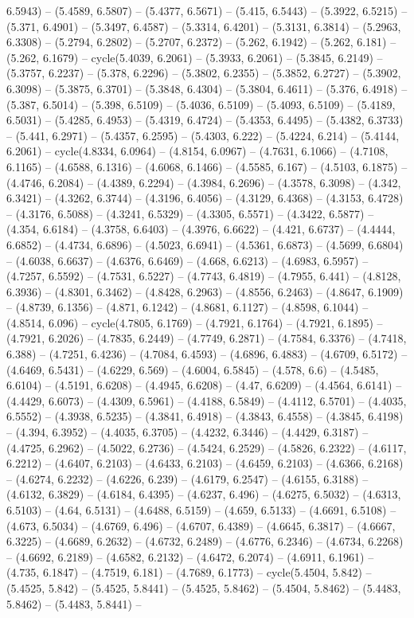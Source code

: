 6.5943) -- (5.4589, 6.5807) -- (5.4377, 6.5671) -- (5.415, 6.5443) -- (5.3922, 6.5215) -- (5.371, 6.4901) -- (5.3497, 6.4587) -- (5.3314, 6.4201) -- (5.3131, 6.3814) -- (5.2963, 6.3308) -- (5.2794, 6.2802) -- (5.2707, 6.2372) -- (5.262, 6.1942) -- (5.262, 6.181) -- (5.262, 6.1679) -- cycle(5.4039, 6.2061) -- (5.3933, 6.2061) -- (5.3845, 6.2149) -- (5.3757, 6.2237) -- (5.378, 6.2296) -- (5.3802, 6.2355) -- (5.3852, 6.2727) -- (5.3902, 6.3098) -- (5.3875, 6.3701) -- (5.3848, 6.4304) -- (5.3804, 6.4611) -- (5.376, 6.4918) -- (5.387, 6.5014) -- (5.398, 6.5109) -- (5.4036, 6.5109) -- (5.4093, 6.5109) -- (5.4189, 6.5031) -- (5.4285, 6.4953) -- (5.4319, 6.4724) -- (5.4353, 6.4495) -- (5.4382, 6.3733) -- (5.441, 6.2971) -- (5.4357, 6.2595) -- (5.4303, 6.222) -- (5.4224, 6.214) -- (5.4144, 6.2061) -- cycle(4.8334, 6.0964) -- (4.8154, 6.0967) -- (4.7631, 6.1066) -- (4.7108, 6.1165) -- (4.6588, 6.1316) -- (4.6068, 6.1466) -- (4.5585, 6.167) -- (4.5103, 6.1875) -- (4.4746, 6.2084) -- (4.4389, 6.2294) -- (4.3984, 6.2696) -- (4.3578, 6.3098) -- (4.342, 6.3421) -- (4.3262, 6.3744) -- (4.3196, 6.4056) -- (4.3129, 6.4368) -- (4.3153, 6.4728) -- (4.3176, 6.5088) -- (4.3241, 6.5329) -- (4.3305, 6.5571) -- (4.3422, 6.5877) -- (4.354, 6.6184) -- (4.3758, 6.6403) -- (4.3976, 6.6622) -- (4.421, 6.6737) -- (4.4444, 6.6852) -- (4.4734, 6.6896) -- (4.5023, 6.6941) -- (4.5361, 6.6873) -- (4.5699, 6.6804) -- (4.6038, 6.6637) -- (4.6376, 6.6469) -- (4.668, 6.6213) -- (4.6983, 6.5957) -- (4.7257, 6.5592) -- (4.7531, 6.5227) -- (4.7743, 6.4819) -- (4.7955, 6.441) -- (4.8128, 6.3936) -- (4.8301, 6.3462) -- (4.8428, 6.2963) -- (4.8556, 6.2463) -- (4.8647, 6.1909) -- (4.8739, 6.1356) -- (4.871, 6.1242) -- (4.8681, 6.1127) -- (4.8598, 6.1044) -- (4.8514, 6.096) -- cycle(4.7805, 6.1769) -- (4.7921, 6.1764) -- (4.7921, 6.1895) -- (4.7921, 6.2026) -- (4.7835, 6.2449) -- (4.7749, 6.2871) -- (4.7584, 6.3376) -- (4.7418, 6.388) -- (4.7251, 6.4236) -- (4.7084, 6.4593) -- (4.6896, 6.4883) -- (4.6709, 6.5172) -- (4.6469, 6.5431) -- (4.6229, 6.569) -- (4.6004, 6.5845) -- (4.578, 6.6) -- (4.5485, 6.6104) -- (4.5191, 6.6208) -- (4.4945, 6.6208) -- (4.47, 6.6209) -- (4.4564, 6.6141) -- (4.4429, 6.6073) -- (4.4309, 6.5961) -- (4.4188, 6.5849) -- (4.4112, 6.5701) -- (4.4035, 6.5552) -- (4.3938, 6.5235) -- (4.3841, 6.4918) -- (4.3843, 6.4558) -- (4.3845, 6.4198) -- (4.394, 6.3952) -- (4.4035, 6.3705) -- (4.4232, 6.3446) -- (4.4429, 6.3187) -- (4.4725, 6.2962) -- (4.5022, 6.2736) -- (4.5424, 6.2529) -- (4.5826, 6.2322) -- (4.6117, 6.2212) -- (4.6407, 6.2103) -- (4.6433, 6.2103) -- (4.6459, 6.2103) -- (4.6366, 6.2168) -- (4.6274, 6.2232) -- (4.6226, 6.239) -- (4.6179, 6.2547) -- (4.6155, 6.3188) -- (4.6132, 6.3829) -- (4.6184, 6.4395) -- (4.6237, 6.496) -- (4.6275, 6.5032) -- (4.6313, 6.5103) -- (4.64, 6.5131) -- (4.6488, 6.5159) -- (4.659, 6.5133) -- (4.6691, 6.5108) -- (4.673, 6.5034) -- (4.6769, 6.496) -- (4.6707, 6.4389) -- (4.6645, 6.3817) -- (4.6667, 6.3225) -- (4.6689, 6.2632) -- (4.6732, 6.2489) -- (4.6776, 6.2346) -- (4.6734, 6.2268) -- (4.6692, 6.2189) -- (4.6582, 6.2132) -- (4.6472, 6.2074) -- (4.6911, 6.1961) -- (4.735, 6.1847) -- (4.7519, 6.181) -- (4.7689, 6.1773) -- cycle(5.4504, 5.842) -- (5.4525, 5.842) -- (5.4525, 5.8441) -- (5.4525, 5.8462) -- (5.4504, 5.8462) -- (5.4483, 5.8462) -- (5.4483, 5.8441) -- 